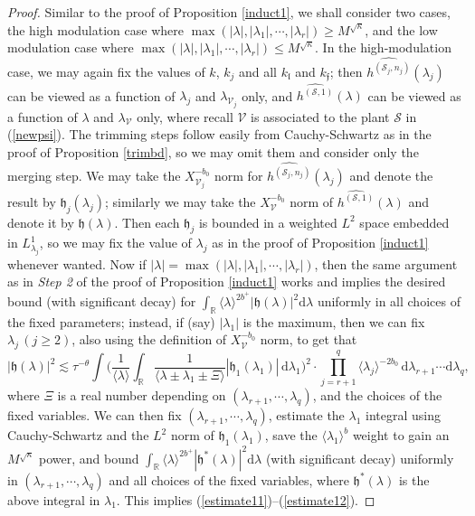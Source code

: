 \documentclass[11 pt,reqno]{amsart}
\theoremstyle{definition}
\theoremstyle{remark}
\numberwithin{equation}{section}
\newcommand{\Sc}{\mathcal{S}}
\newcommand{\Vc}{\mathcal{V}}
\newcommand{\Rb}{\mathbb{R}}
\newcommand{\ff}{\mathfrak{f}}
\newcommand{\hf}{\mathfrak{h}}
\newcommand{\lf}{\mathfrak{l}}
\begin{document}
{\begin{proof}
Similar to the proof of Proposition \ref{induct1}, we shall consider two cases, the high modulation case where $\max(|\lambda|,|\lambda_1|,\cdots,|\lambda_r|)\geq M^{\sqrt{\kappa}}$, and the low modulation case where $\max(|\lambda|,|\lambda_1|,\cdots,|\lambda_r|)\leq M^{\sqrt{\kappa}}$. In the high-modulation case, we may again fix the values of $k$, $k_j$ and all $k_\lf$ and $k_\ff$; then $\widehat{h^{(\Sc_j,n_j)}}(\lambda_j)$ can be viewed as a function of $\lambda_j$ and $\lambda_{\Vc_j}$ only, and $\widehat{h^{(\Sc,1)}}(\lambda)$ can be viewed as a function of $\lambda$ and $\lambda_\Vc$ only, where recall $\Vc$ is associated to the plant $\Sc$ in (\ref{newpsi}). The trimming steps follow easily from Cauchy-Schwartz as in the proof of Proposition \ref{trimbd}, so we may omit them and consider only the merging step. We may take the $X_{\Vc_j}^{-b_0}$ norm for $\widehat{h^{(\Sc_j,n_j)}}(\lambda_j)$ and denote the result by $\hf_j(\lambda_j)$; similarly we may take the $X_\Vc^{-b_0}$ norm of $\widehat{h^{(\Sc,1)}}(\lambda)$ and denote it by $\hf(\lambda)$. Then each $\hf_j$ is bounded in a weighted $L^2$ space embedded in $L_{\lambda_j}^1$, so we may fix the value of $\lambda_j$ as in the proof of Proposition \ref{induct1} whenever wanted. Now if $|\lambda|=\max(|\lambda|,|\lambda_1|,\cdots,|\lambda_r|)$, then the same argument as in \emph{Step 2} of the proof of Proposition \ref{induct1} works and implies the desired bound (with significant decay) for $\int_\Rb \langle \lambda\rangle^{2b^+}|\hf(\lambda)|^2\mathrm{d}\lambda$ uniformly in all choices of the fixed parameters; instead, if (say) $|\lambda_1|$ is the maximum, then we can fix $\lambda_j\,(j\geq 2)$, also using the definition of $X_\Vc^{-b_0}$ norm, to get that
\[|\hf(\lambda)|^2\lesssim\tau^{-\theta}\int\bigg(\frac{1}{\langle\lambda\rangle}\int_\Rb\frac{1}{\langle\lambda\pm\lambda_1\pm\Xi\rangle}|\hf_1(\lambda_1)|\,\mathrm{d}\lambda_1\bigg)^2\cdot\prod_{j=r+1}^q\langle \lambda_j\rangle^{-2b_0}\,\mathrm{d}\lambda_{r+1}\cdots\mathrm{d}\lambda_q,\] where $\Xi$ is a real number depending on $(\lambda_{r+1},\cdots,\lambda_q)$, and the choices of the fixed variables. We can then fix $(\lambda_{r+1},\cdots,\lambda_q)$, estimate the $\lambda_1$ integral using Cauchy-Schwartz and the $L^2$ norm of $\hf_1(\lambda_1)$, save the $\langle\lambda_1\rangle^b$ weight to gain an $M^{\sqrt{\kappa}}$ power, and bound $\int_\Rb \langle \lambda\rangle^{2b^+}|\hf^*(\lambda)|^2\mathrm{d}\lambda$ (with significant decay) uniformly in $(\lambda_{r+1},\cdots,\lambda_q)$ and all choices of the fixed variables, where $\hf^*(\lambda)$ is the above integral in $\lambda_1$. This implies (\ref{estimate11})--(\ref{estimate12}).


\end{proof}}
\end{document}
